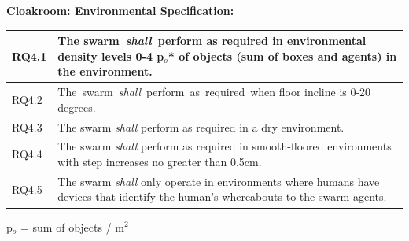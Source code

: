 \documentclass[lettersize,journal]{IEEEtran}
\begin{document}
\noindent \textbf{Cloakroom: Environmental Specification: }
\begin{center}
	\begin{tabular}{|p{7mm}|p{72mm}|}
		\hline
		RQ4.1 & The swarm \emph{shall} perform as required in environmental density levels 0-4 p$_o$* of objects (sum of boxes and agents) in the environment.
		\\ 
		\hline
		RQ4.2 & The swarm \emph{shall} perform as required when floor incline is 0-20 degrees.
		\\ 
		\hline
		RQ4.3 & The swarm \emph{shall} perform as required in a dry environment.
		\\ 
		\hline
		RQ4.4 & The swarm \emph{shall} perform as required in smooth-floored environments with step increases no greater than 0.5cm.
		\\ 
		\hline
		RQ4.5 & The swarm \emph{shall} only operate in environments where humans have devices that identify the human’s whereabouts to the swarm agents.
		\\		[1ex] 		
		\hline
	\end{tabular}
\end{center}
\noindent *p$_o$ = sum of objects  / m$^2$
\end{document}
